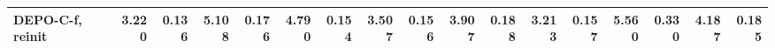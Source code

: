 \begin{table}[h!]
\begin{tabular}{lrrrrrrrrrrrrrrrr}
DEPO-C-f, reinit & {\cellcolor[HTML]{0A7B41}} \color[HTML]{F1F1F1} 3.220 & {\cellcolor[HTML]{39A758}} \color[HTML]{F1F1F1} 0.136 & {\cellcolor[HTML]{0C7F43}} \color[HTML]{F1F1F1} 5.108 & {\cellcolor[HTML]{39A758}} \color[HTML]{F1F1F1} 0.176 & {\cellcolor[HTML]{3FAA59}} \color[HTML]{F1F1F1} 4.790 & {\cellcolor[HTML]{BDE379}} \color[HTML]{000000} 0.154 & {\cellcolor[HTML]{0D8044}} \color[HTML]{F1F1F1} 3.507 & {\cellcolor[HTML]{3CA959}} \color[HTML]{F1F1F1} 0.156 & {\cellcolor[HTML]{138C4A}} \color[HTML]{F1F1F1} 3.907 & {\cellcolor[HTML]{219C52}} \color[HTML]{F1F1F1} 0.188 & {\cellcolor[HTML]{0E8245}} \color[HTML]{F1F1F1} 3.213 & {\cellcolor[HTML]{148E4B}} \color[HTML]{F1F1F1} 0.157 & {\cellcolor[HTML]{69BE63}} \color[HTML]{F1F1F1} 5.560 & {\cellcolor[HTML]{EC5C3B}} \color[HTML]{F1F1F1} 0.330 & {\cellcolor[HTML]{0E8245}} \color[HTML]{F1F1F1} 4.187 & {\cellcolor[HTML]{3CA959}} \color[HTML]{F1F1F1} 0.185 \\
\bottomrule
\end{tabular}
\end{table}
